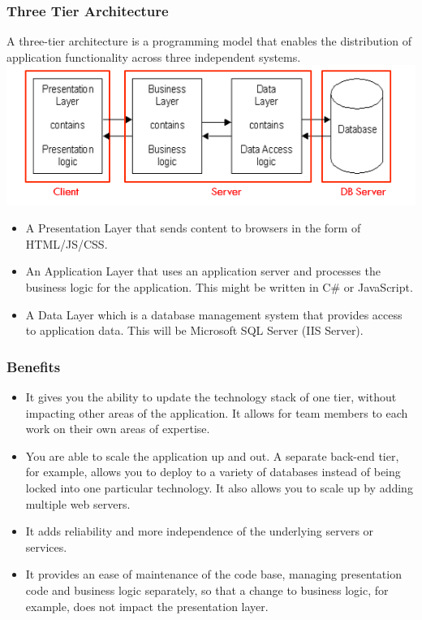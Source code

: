 \documentclass{article}
\begin{document}
\subsubsection{Three Tier Architecture}
A three-tier architecture is a programming model that enables the distribution of application functionality across three independent systems. \cite{descTier} \\
\includegraphics[scale=1]{Capture2.png} 
\begin{itemize}
\item A Presentation Layer that sends content to browsers in the form of HTML/JS/CSS. 
\item An Application Layer that uses an application server and processes the business logic for the application. This might be written in C\# or JavaScript.
\item A Data Layer which is a database management system that provides access to application data. This will be Microsoft SQL Server (IIS Server). \\
\end{itemize}
\subsubsection{Benefits}
\begin{itemize}
\item It gives you the ability to update the technology stack of one tier, without impacting other areas of the application.
It allows for team members to each work on their own areas of expertise.
\item You are able to scale the application up and out. A separate back-end tier, for example, allows you to deploy to a variety of databases instead of being locked into one particular technology. It also allows you to scale up by adding multiple web servers.
\item It adds reliability and more independence of the underlying servers or services.
\item It provides an ease of maintenance of the code base, managing presentation code and business logic separately, so that a change to business logic, for example, does not impact the presentation layer. \cite{tier}
\end{itemize}
\end{document}
